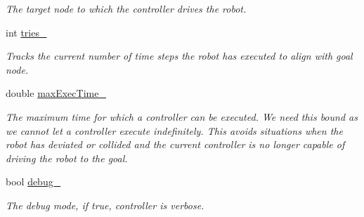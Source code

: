 \begin{DoxyCompactItemize}
\begin{DoxyCompactList}\small\item\em \-The target node to which the controller drives the robot. \end{DoxyCompactList}\item 
\hypertarget{class_controller_adb2235b65db786dbd287e0b57a42b959}{int \hyperlink{class_controller_adb2235b65db786dbd287e0b57a42b959}{tries\-\_\-}}\label{class_controller_adb2235b65db786dbd287e0b57a42b959}

\begin{DoxyCompactList}\small\item\em \-Tracks the current number of time steps the robot has executed to align with goal node. \end{DoxyCompactList}\item 
\hypertarget{class_controller_aeddadf542e253ff266e596eb0574c3de}{double \hyperlink{class_controller_aeddadf542e253ff266e596eb0574c3de}{max\-Exec\-Time\-\_\-}}\label{class_controller_aeddadf542e253ff266e596eb0574c3de}

\begin{DoxyCompactList}\small\item\em \-The maximum time for which a controller can be executed. \-We need this bound as we cannot let a controller execute indefinitely. \-This avoids situations when the robot has deviated or collided and the current controller is no longer capable of driving the robot to the goal. \end{DoxyCompactList}\item 
\hypertarget{class_controller_a1288c6ee79e962bba7421ffb59bae047}{bool \hyperlink{class_controller_a1288c6ee79e962bba7421ffb59bae047}{debug\-\_\-}}\label{class_controller_a1288c6ee79e962bba7421ffb59bae047}

\begin{DoxyCompactList}\small\item\em \-The debug mode, if true, controller is verbose. \end{DoxyCompactList}\end{DoxyCompactItemize}
